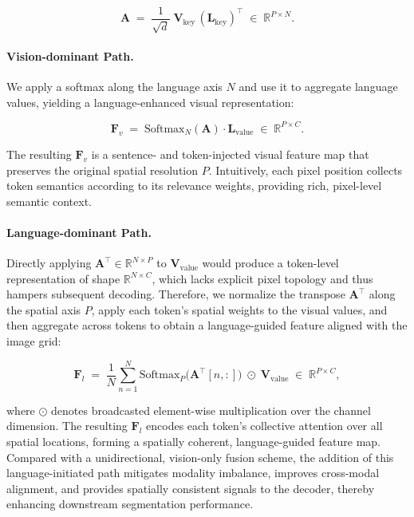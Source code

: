 \documentclass{article} %
\begin{document}
\begin{equation}
\mathbf A \;=\; \frac{1}{\sqrt{d}}\;\mathbf V_{\text{key}}\,(\mathbf L_{\text{key}})^{\top}
\;\in\; \mathbb{R}^{P\times N}.
\end{equation}

\paragraph{Vision-dominant Path.}

We apply a softmax along the language axis $N$ and use it to aggregate language values, yielding a language-enhanced visual representation:

\begin{equation}
\mathbf F_{v} \;=\; \mathrm{Softmax}_{N}(\mathbf A) \cdot \mathbf L_{\text{value}}
\;\in\; \mathbb{R}^{P\times C}.
\end{equation}

The resulting $\mathbf F_{v}$ is a sentence- and token-injected visual feature map that preserves the original spatial resolution $P$. Intuitively, each pixel position collects token semantics according to its relevance weights, providing rich, pixel-level semantic context.

\paragraph{Language-dominant Path.}

Directly applying $\mathbf A^{\top}\in\mathbb{R}^{N\times P}$ to $\mathbf V_{\text{value}}$ would produce a token-level representation of shape $\mathbb{R}^{N\times C}$, which lacks explicit pixel topology and thus hampers subsequent decoding. Therefore, we normalize the transpose $\mathbf A^{\top}$ along the spatial axis $P$, apply each token’s spatial weights to the visual values, and then aggregate across tokens to obtain a language-guided feature aligned with the image grid:

\begin{equation}
\mathbf F_{l} \;=\; \frac{1}{N}\sum_{n=1}^{N} \mathrm{Softmax}_{P}\!\big(\mathbf A^{\top}[n,:]\big)\;\odot\;\mathbf V_{\text{value}}
\;\in\; \mathbb{R}^{P\times C},
\end{equation}

where $\odot$ denotes broadcasted element-wise multiplication over the channel dimension. The resulting $\mathbf F_{l}$ encodes each token’s collective attention over all spatial locations, forming a spatially coherent, language-guided feature map. Compared with a unidirectional, vision-only fusion scheme, the addition of this language-initiated path mitigates modality imbalance, improves cross-modal alignment, and provides spatially consistent signals to the decoder, thereby enhancing downstream segmentation performance.
\end{document}
